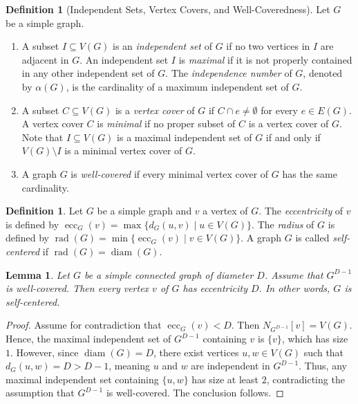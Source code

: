 \documentclass[10pt,a4paper]{amsart}
\numberwithin{equation}{section}
\newtheorem{lem}[thm]{\bf Lemma}
\theoremstyle{definition}
\newtheorem{defn}[thm]{Definition}
\DeclareMathOperator{\rad}{rad}
\DeclareMathOperator{\ecc}{ecc}
\DeclareMathOperator{\diam}{diam}
\begin{document}
\begin{defn}[Independent Sets, Vertex Covers, and Well-Coveredness]
Let $G$ be a simple graph.
\begin{enumerate}
    \item A subset $I \subseteq V(G)$ is an \emph{independent set} of $G$ if no two vertices in $I$ are adjacent in $G$. An independent set $I$ is \emph{maximal} if it is not properly contained in any other independent set of $G$. The \emph{independence number} of $G$, denoted by $\alpha(G)$, is the cardinality of a maximum independent set of $G$.
    \item A subset $C \subseteq V(G)$ is a \emph{vertex cover} of $G$ if $C \cap e \neq \emptyset$ for every $e \in E(G)$. A vertex cover $C$ is \emph{minimal} if no proper subset of $C$ is a vertex cover of $G$. Note that $I \subseteq V(G)$ is a maximal independent set of $G$ if and only if $V(G) \setminus I$ is a minimal vertex cover of $G$.
    \item A graph $G$ is \emph{well-covered} if every minimal vertex cover of $G$ has the same cardinality.
\end{enumerate}
\end{defn}


\begin{defn} 
Let $G$ be a simple graph and $v$ a vertex of $G$. The \emph{eccentricity} of $v$ is defined by $\ecc_G(v) = \max \{d_G(u,v) \mid u \in V(G)\}$. The \emph{radius} of $G$ is defined by $\rad(G) = \min \{ \ecc_G(v) \mid v \in V(G)\}$. A graph $G$ is called \emph{self-centered} if $\rad(G) = \diam(G)$.
\end{defn}

\begin{lem}\label{lem_ecc} 
Let $G$ be a simple connected graph of diameter $D$. Assume that $G^{D-1}$ is well-covered. Then every vertex $v$ of $G$ has eccentricity $D$. In other words, $G$ is self-centered.
\end{lem}

\begin{proof} 
Assume for contradiction that $\ecc_G(v) < D$. Then $N_{G^{D-1}}[v] = V(G)$. Hence, the maximal independent set of $G^{D-1}$ containing $v$ is $\{v\}$, which has size $1$. However, since $\diam(G) = D$, there exist vertices $u, w \in V(G)$ such that $d_G(u,w) = D > D-1$, meaning $u$ and $w$ are independent in $G^{D-1}$. Thus, any maximal independent set containing $\{u, w\}$ has size at least $2$, contradicting the assumption that $G^{D-1}$ is well-covered. The conclusion follows.
\end{proof}
\end{document}
